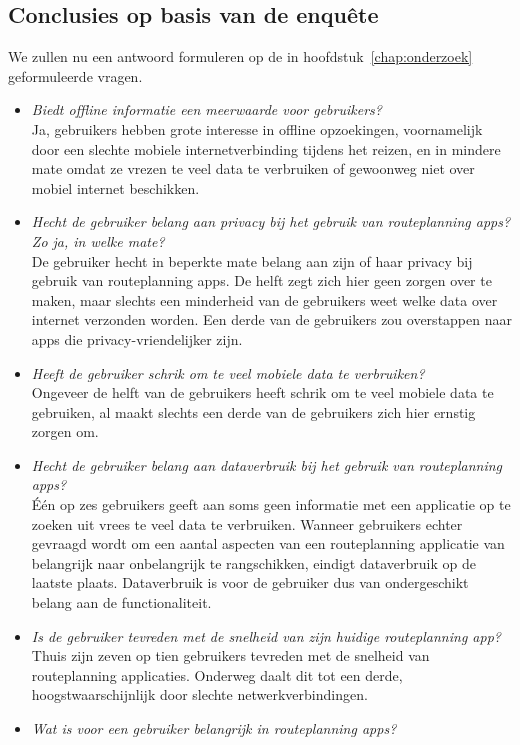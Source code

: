 \subsection{Conclusies op basis van de enquête}
We zullen nu een antwoord formuleren op de in hoofdstuk~\ref{chap:onderzoek} geformuleerde vragen.
\begin{itemize}
	\item \textit{Biedt offline informatie een meerwaarde voor gebruikers?}\\
	Ja, gebruikers hebben grote interesse in offline opzoekingen, voornamelijk door een slechte mobiele internetverbinding tijdens het reizen, en in mindere mate omdat ze vrezen te veel data te verbruiken of gewoonweg niet over mobiel internet beschikken.
	\item \textit{Hecht de gebruiker belang aan privacy bij het gebruik van routeplanning apps? Zo ja, in welke mate?}\\
	De gebruiker hecht in beperkte mate belang aan zijn of haar privacy bij gebruik van routeplanning apps. De helft zegt zich hier geen zorgen over te maken, maar slechts een minderheid van de gebruikers weet welke data over internet verzonden worden. Een derde van de gebruikers zou overstappen naar apps die privacy-vriendelijker zijn.
	\item \textit{Heeft de gebruiker schrik om te veel mobiele data te verbruiken?}\\
	Ongeveer de helft van de gebruikers heeft schrik om te veel mobiele data te gebruiken, al maakt slechts een derde van de gebruikers zich hier ernstig zorgen om.
	\item \textit{Hecht de gebruiker belang aan dataverbruik bij het gebruik van routeplanning apps?}\\
	Één op zes gebruikers geeft aan soms geen informatie met een applicatie op te zoeken uit vrees te veel data te verbruiken. Wanneer gebruikers echter gevraagd wordt om een aantal aspecten van een routeplanning applicatie van belangrijk naar onbelangrijk te rangschikken, eindigt dataverbruik op de laatste plaats. Dataverbruik is voor de gebruiker dus van ondergeschikt belang aan de functionaliteit.
	\item \textit{Is de gebruiker tevreden met de snelheid van zijn huidige routeplanning app?}\\
	Thuis zijn zeven op tien gebruikers tevreden met de snelheid van routeplanning applicaties. Onderweg daalt dit tot een derde, hoogstwaarschijnlijk door slechte netwerkverbindingen.
	\item \textit{Wat is voor een gebruiker belangrijk in routeplanning apps?}\\

\end{itemize}
